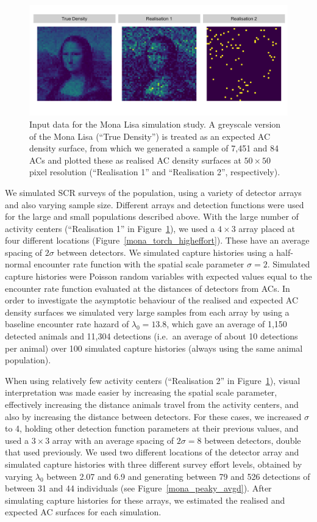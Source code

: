 \documentclass[10pt,a4paper]{article}
\begin{document}
\begin{figure}[htbp]
\centering
\includegraphics[width=1\textwidth]{mona_inputdata.png}
\caption{Input data for the Mona Lisa simulation study. A greyscale version of the Mona Lisa (``True Density'') is treated as an expected AC density surface, from which we generated a sample of 7,451 and 84 ACs and plotted these as realised AC density surfaces at $50\times 50$ pixel resolution (``Realisation 1'' and ``Realisation 2'', respectively).}
\label{mlinputs}
\end{figure}

We simulated SCR surveys of the population, using a variety of detector arrays and also varying sample size. Different arrays and detection functions were used for the large and small populations described above. With the large number of activity centers (``Realisation 1'' in Figure~\ref{mlinputs}), we used a $4\times 3$ array placed at four different locations (Figure~\ref{mona_torch_higheffort}). These have an average spacing of $2\sigma$ between detectors. We simulated capture histories using a half-normal encounter rate function with the spatial scale parameter $\sigma=2$. Simulated capture histories were Poisson random variables with expected values equal to the encounter rate function evaluated at the distances of detectors from ACs. In order to investigate the asymptotic behaviour of the realised and expected AC density surfaces we simulated very large samples from each array by using a baseline encounter rate hazard of $\lambda_0=13.8$, which gave an average of 1,150 detected animals and 11,304 detections (i.e.\ an average of about 10 detections per animal) over 100 simulated capture histories (always using the same animal population). 

When using relatively few activity centers (``Realisation 2'' in Figure~\ref{mlinputs}), visual interpretation was made easier by increasing the spatial scale parameter, effectively increasing the distance animals travel from the activity centers, and also by increasing the distance between detectors. For these cases, we increased $\sigma$ to 4, holding other detection function parameters at their previous values, and used a $3 \times 3$ array with an average spacing of $2\sigma=8$ between detectors, double that used previously. We used two different locations of the detector array and simulated capture histories with three different survey effort levels, obtained by varying $\lambda_0$ between 2.07 and 6.9 and generating between 79 and 526 detections of between 31 and 44 individuals (see Figure~\ref{mona_peaky_avgd}). After simulating capture histories for these arrays, we estimated the realised and expected AC surfaces for each simulation. 
\end{document}
